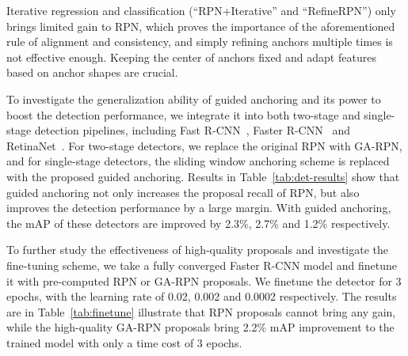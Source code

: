 \documentclass[10pt,twocolumn,letterpaper]{article}
\begin{document}
Iterative regression and classification (``RPN+Iterative'' and ``RefineRPN'')
only brings limited gain to RPN,
which proves the importance of the aforementioned rule of alignment and consistency,
and simply refining anchors multiple times is not effective enough.
Keeping the center of anchors fixed and adapt features based on anchor shapes are crucial.

To investigate the generalization ability of guided anchoring and its power
to boost the detection performance, we integrate it into both two-stage and
single-stage detection pipelines, including Fast R-CNN~\cite{girshick2015fast},
Faster R-CNN~\cite{ren2015faster} and RetinaNet~\cite{lin2017focal}.
For two-stage detectors, we replace the original RPN with GA-RPN, and for
single-stage detectors, the sliding window anchoring scheme is replaced with
the proposed guided anchoring.
Results in Table~\ref{tab:det-results} show that guided anchoring not only
increases the proposal recall of RPN, but also improves the detection performance by a large margin.
With guided anchoring, the mAP of these detectors are improved by 2.3\%, 2.7\% and 1.2\% respectively.

To further study the effectiveness of high-quality proposals and investigate
the fine-tuning scheme,
we take a fully converged Faster R-CNN model and finetune it with pre-computed RPN or GA-RPN proposals.
We finetune the detector for 3 epochs, with the learning rate of 0.02, 0.002 and 0.0002 respectively.
The results are in Table~\ref{tab:finetune} illustrate that RPN proposals cannot
bring any gain,
while the high-quality GA-RPN proposals bring 2.2\% mAP improvement to the
trained model with only a time cost of 3 epochs.
\end{document}

